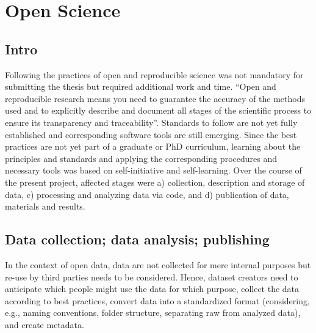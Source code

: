 



\section{Open Science}






\subsection{Intro}
%
Following the practices of open and reproducible science was not mandatory for
submitting the thesis but required additional work and time.
%
``Open and reproducible research means you need to guarantee the accuracy of the
methods used and to explicitly describe and document all stages of the
scientific process to ensure its transparency and traceability''.
%
Standards to follow are not yet fully established and corresponding software
tools are still emerging.
%
Since the best practices are not yet part of a graduate or PhD curriculum,
learning about the principles and standards and applying the corresponding
procedures and necessary tools was based on self-initiative and self-learning.
%
Over the course of the present project, affected stages were
a) collection, description and storage of data,
c) processing and analyzing data via code, and
d) publication of data, materials and results.


\subsection{Data collection; data analysis; publishing}
%
In the context of open data, data are not collected for mere internal purposes
but re-use by third parties needs to be considered.
%
Hence, dataset creators need to anticipate which people might use the data for
which purpose, collect the data according to best practices, convert data into a
standardized format (considering, e.g., naming conventions, folder structure,
separating raw from analyzed data), and create metadata.

